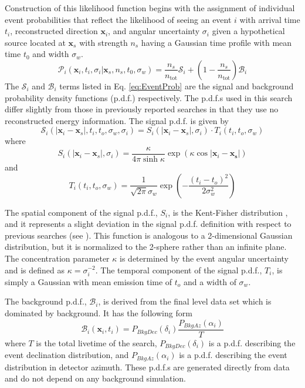 \documentclass[manuscript]{aastex}
\begin{document}
Construction of this likelihood function begins with the assignment of individual event probabilities that reflect the likelihood of seeing an event $i$ with arrival time $t_i$, reconstructed direction $\mathbf{x}_i$, and angular uncertainty $\sigma_i$ given a hypothetical source located at $\mathbf{x}_s$ with strength $n_s$ having a Gaussian time profile with mean time $t_0$ and width $\sigma_w$.
\begin{equation}\label{eq:EventProb}
\mathcal{P}_i(\mathbf{x}_i,t_i,\sigma_i|\mathbf{x}_s,n_s,t_0,\sigma_w) = \frac{n_s}{n_{\mathrm{tot}}} \mathcal{S}_i + \left(1-\frac{n_s}{n_{\mathrm{tot}}}\right) \mathcal{B}_i
\end{equation}
The $\mathcal{S}_i$ and $\mathcal{B}_i$ terms listed in Eq. \ref{eq:EventProb} are the signal and background probability density functions (p.d.f.) respectively. The p.d.f.s used in this search differ slightly from those in previously reported searches in that they use no reconstructed energy information. The signal p.d.f. is given by
\begin{equation}
\mathcal{S}_i(|\mathbf{x}_i-\mathbf{x}_s|,t_i,t_o,\sigma_w,\sigma_i) = S_i(|\mathbf{x}_i-\mathbf{x}_s|,\sigma_i) \cdot T_i(t_i,t_o,\sigma_w)
\end{equation}
where 
\begin{equation}
S_i(|\mathbf{x}_i-\mathbf{x}_s|,\sigma_i) = \frac{\kappa}{4\pi \sinh \kappa} \exp \left(\kappa \cos |\mathbf{x}_i-\mathbf{x_s}|\right)
\end{equation}
and
\begin{equation}
T_i(t_i,t_o,\sigma_w) = \frac{1}{\sqrt{2\pi}\sigma_w} \exp \left(-\frac{(t_i-t_o)^2}{2 \sigma_w^2}\right)
\end{equation}

The spatial component of the signal p.d.f., $S_i$, is the Kent-Fisher distribution \citep{Fisher_Bingham}, and it represents a slight deviation in the signal p.d.f. definition with respect to previous searches (see \cite{2014ApJ...796..109A}). This function is analogous to a 2-dimensional Gaussian distribution, but it is normalized to the 2-sphere rather than an infinite plane. The concentration parameter $\kappa$ is determined by the event angular uncertainty and is defined as $\kappa = \sigma_{i}^{-2}$. The temporal component of the signal p.d.f., $T_i$, is simply a Gaussian with mean emission time of $t_o$ and a width of $\sigma_w$.

The background p.d.f., $\mathcal{B}_i$, is derived from the final level data set which is dominated by background. It has the following form
\begin{equation}
\mathcal{B}_i(\mathbf{x}_i,t_i) = P_{BkgDec}(\delta_i)\frac{P_{BkgAz}(\alpha_i)}{T}
\end{equation}
where $T$ is the total livetime of the search, $P_{BkgDec}(\delta_i)$ is a p.d.f. describing the event declination distribution, and $P_{BkgAz}(\alpha_i)$ is a p.d.f. describing the event distribution in detector azimuth. These p.d.f.s are generated directly from data and do not depend on any background simulation.
\end{document}
